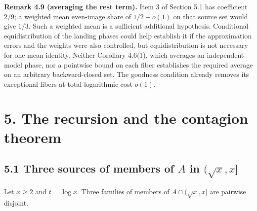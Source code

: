\documentclass[11pt,a4paper]{article}
\begin{document}
\textbf{Remark 4.9 (averaging the rest term).} Item 3 of Section 5.1 has
coefficient \(2/9\); a weighted mean even-image share of \(1/2+o(1)\) on
that source set would give \(1/3\). Such a weighted mean is a sufficient
additional hypothesis. Conditional equidistribution of the landing
phases could help establish it if the approximation errors and the
weights were also controlled, but equidistribution is not necessary for
one mean identity. Neither Corollary 4.6(1), which averages an
independent model phase, nor a pointwise bound on each fiber establishes
the required average on an arbitrary backward-closed set. The goodness
condition already removes its exceptional fibers at total logarithmic
cost \(o(1)\).

\section{5. The recursion and the contagion
theorem}\label{the-recursion-and-the-contagion-theorem}

\subsection{\texorpdfstring{5.1 Three sources of members of \(A\) in
\((\sqrt x,x]\)}{5.1 Three sources of members of A in (\textbackslash sqrt x,x{]}}}\label{three-sources-of-members-of-a-in-sqrt-xx}

Let \(x\ge 2\) and \(t=\log x\). Three families of members of
\(A\cap(\sqrt x,x]\) are pairwise disjoint.
\end{document}
